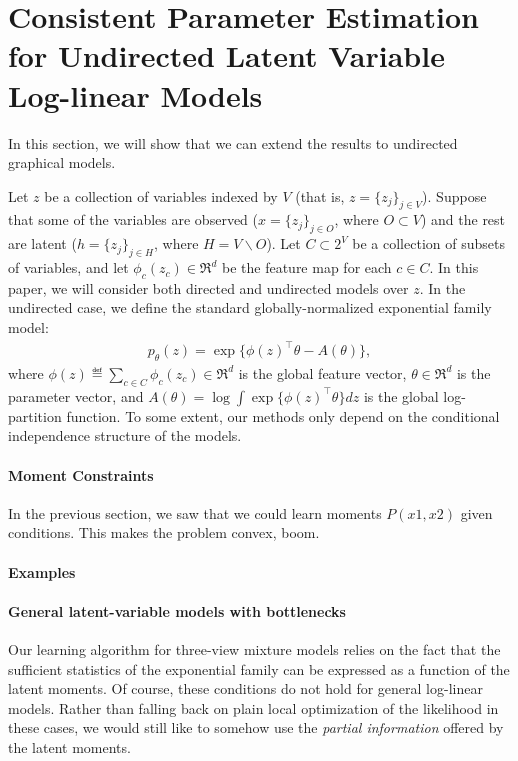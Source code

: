 \section{Consistent Parameter Estimation for Undirected Latent Variable Log-linear Models}
\label{sec:undirected}

In this section, we will show that we can extend the results to undirected graphical models.

Let $z$ be a collection of variables indexed by $V$ (that is, $z = \{z_j\}_{j \in V}$).
Suppose that some of the variables are observed ($x = \{ z_j \}_{j \in O}$, where $O \subset V$) 
and the rest are latent ($h = \{ z_j \}_{j \in H}$, where $H = V \backslash O$).
Let $C \subset 2^V$ be a collection of subsets of variables,
and let $\phi_c(z_c) \in \Re^d$ be the feature map for each $c \in C$.
In this paper, we will consider both directed and undirected models over $z$.
In the undirected case, we define the standard globally-normalized exponential family model:
\begin{align}
  \label{eqn:undirectedSetup}
  p_\theta(z) = \exp\{ \phi(z)^\top\theta - A(\theta) \},
\end{align}
where $\phi(z) \eqdef \sum_{c \in C} \phi_c(z_c) \in \Re^d$ is the global feature vector, $\theta \in \Re^d$ is the parameter vector,
and $A(\theta) = \log \int \exp\{\phi(z)^\top\theta\} dz$ is the global log-partition function.
To some extent, our methods only depend on the conditional independence
structure of the models.

\paragraph{Moment Constraints}

In the previous section, we saw that we could learn moments $P(x1,x2)$ given conditions. This makes the problem convex, boom.

\paragraph{Examples}

\paragraph{General latent-variable models with bottlenecks}

Our learning algorithm for three-view mixture models relies on the fact that
the sufficient statistics of the exponential family
can be expressed as a function of the latent moments.
Of course, these conditions do not hold for general log-linear models.
Rather than falling back on plain local optimization of the likelihood in these
cases, we would still like
to somehow use the \emph{partial information} offered by the latent moments.

